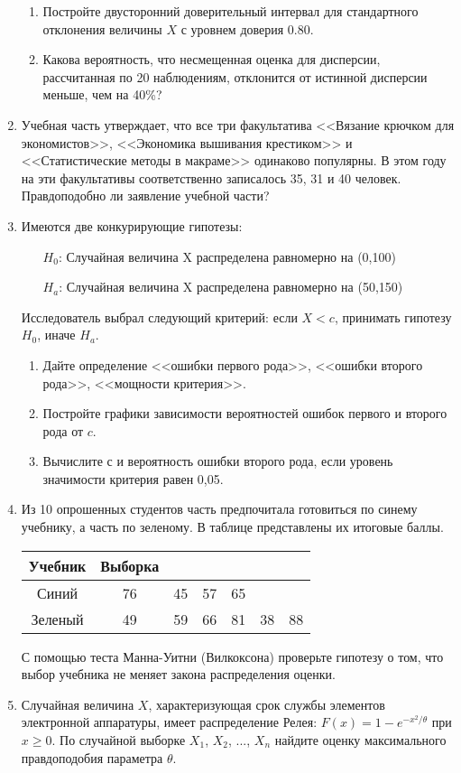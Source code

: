 \documentclass[pdftex,12pt,a4paper]{article}
\begin{document}
\begin{enumerate}
\begin{enumerate}
\item Постройте двусторонний доверительный интервал для стандартного отклонения величины $X$ с уровнем доверия 0.80.
\item Какова вероятность, что несмещенная оценка для дисперсии, рассчитанная по 20 наблюдениям, отклонится от истинной дисперсии меньше, чем на 40\%?
\end{enumerate}
\item Учебная часть утверждает, что все три факультатива <<Вязание крючком для экономистов>>, <<Экономика вышивания крестиком>> и <<Статистические методы в макраме>> одинаково популярны. В этом году на эти факультативы соответственно записалось 35, 31 и 40 человек. Правдоподобно ли заявление учебной части?
\item Имеются две конкурирующие гипотезы:
\begin{enumerate}
\item[$H_0$:] Случайная величина X распределена равномерно на (0,100)
\item[$H_a$:] Случайная величина X распределена равномерно на (50,150)
\end{enumerate}
Исследователь выбрал следующий критерий: если $X<c$, принимать гипотезу $H_0$, иначе  $H_a$.    
\begin{enumerate}
\item Дайте определение <<ошибки первого рода>>, <<ошибки второго рода>>, <<мощности критерия>>. 
\item Постройте графики зависимости вероятностей ошибок первого и второго рода от $c$.
\item Вычислите $с$ и вероятность ошибки второго рода, если уровень значимости критерия равен 0,05.
\end{enumerate}
\item Из 10 опрошенных студентов часть предпочитала готовиться по синему учебнику, а часть по зеленому. В таблице представлены их итоговые баллы. 


\begin{tabular}{c|cccccc}
Учебник & Выборка &  &  &   &   &   \\ 
\hline 
Синий & 76 & 45 & 57 & 65 &   &   \\ 
Зеленый & 49 & 59 & 66 & 81 & 38 & 88 \\ 
\end{tabular} 


С помощью теста Манна-Уитни (Вилкоксона) проверьте гипотезу о том, что выбор учебника не меняет закона распределения оценки.

\item Случайная величина $X$, характеризующая срок службы элементов электронной аппаратуры, имеет распределение Релея: $F(x)=1-e^{-x^2/\theta}$ при $x\geq 0$. По случайной выборке $X_1$, $X_2$, ..., $X_n$ найдите оценку максимального правдоподобия параметра $\theta$.


\end{enumerate}
\end{document}
